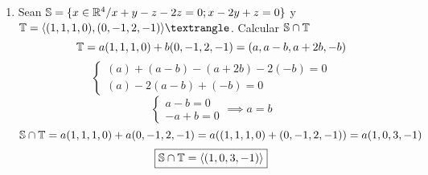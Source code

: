 \documentclass[../practica.root.tex]{subfiles}
\begin{document}
\begin{enumerate}
    \item Sean $\mathbb{S} = \{x \in \mathbb{R}^4 / x + y - z - 2z = 0; x - 2y + z = 0\}$ y $\T = \langle(1,1,1,0),(0,-1,2,-1)\rangle⟩$. Calcular $\mathbb{S} \cap \mathbb{T}$ %
          \[
              \mathbb{T} = a(1,1,1,0) + b(0,-1,2,-1) = (a, a-b, a+2b, -b)
          \] \[
              \begin{cases}
                  (a) + (a-b) - (a+2b) - 2(-b) = 0 \\
                  (a) - 2(a-b) + (-b) = 0
              \end{cases}
          \] \[
              \begin{cases}
                  a - b = 0 \\
                  -a + b = 0
              \end{cases}
              \implies
              a = b
          \] \[
              \mathbb{S}\cap\mathbb{T} = a(1,1,1,0) + a(0,-1,2,-1) = a((1,1,1,0) + (0,-1,2,-1)) = a(1,0,3,-1)
          \] \[
              \boxed{\mathbb{S}\cap\mathbb{T} = \langle(1,0,3,-1)\rangle}
          \]


\end{enumerate}
\end{document}
